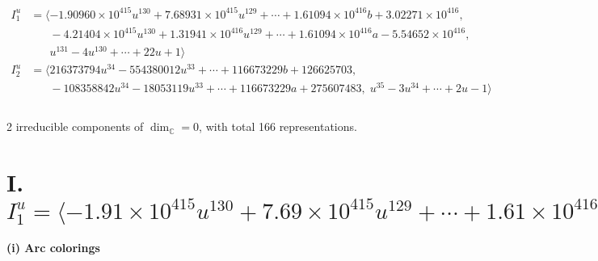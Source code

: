 \documentclass[1p]{elsarticle_modified}
\theoremstyle{definition}
\begin{document}
\begin{align*}
I^u_{1}&=\langle 
-1.90960\times10^{415} u^{130}+7.68931\times10^{415} u^{129}+\cdots+1.61094\times10^{416} b+3.02271\times10^{416},\\
\phantom{I^u_{1}}&\phantom{= \langle  }-4.21404\times10^{415} u^{130}+1.31941\times10^{416} u^{129}+\cdots+1.61094\times10^{416} a-5.54652\times10^{416},\\
\phantom{I^u_{1}}&\phantom{= \langle  }u^{131}-4 u^{130}+\cdots+22 u+1\rangle \\
I^u_{2}&=\langle 
216373794 u^{34}-554380012 u^{33}+\cdots+116673229 b+126625703,\\
\phantom{I^u_{2}}&\phantom{= \langle  }-108358842 u^{34}-18053119 u^{33}+\cdots+116673229 a+275607483,\;u^{35}-3 u^{34}+\cdots+2 u-1\rangle \\
\\
\end{align*}
\raggedright * 2 irreducible components of $\dim_{\mathbb{C}}=0$, with total 166 representations.\\
\newpage
\renewcommand{\arraystretch}{1}
\centering \section*{I. $I^u_{1}= \langle -1.91\times10^{415} u^{130}+7.69\times10^{415} u^{129}+\cdots+1.61\times10^{416} b+3.02\times10^{416},\;-4.21\times10^{415} u^{130}+1.32\times10^{416} u^{129}+\cdots+1.61\times10^{416} a-5.55\times10^{416},\;u^{131}-4 u^{130}+\cdots+22 u+1 \rangle$}
\flushleft \textbf{(i) Arc colorings}\\
\end{document}
